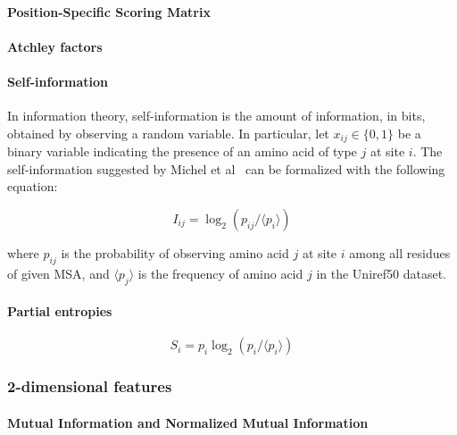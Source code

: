        \paragraph{Position-Specific Scoring Matrix}

        \paragraph{Atchley factors}


        \paragraph{Self-information}

            In information theory, self-information is the amount of information, in bits,
            obtained by observing a random variable. In particular, let $x_{ij} \in \{0, 1\}$ be
            a binary variable indicating the presence of an amino acid of type $j$ at site $i$.
            The self-information suggested by Michel et al~\cite{Michel383133} can be formalized
            with the following equation:

            \begin{equation}
                I_{ij} = \log_2 (p_{ij} / \langle p_i \rangle)
            \end{equation}

            where $p_{ij}$ is the probability of observing amino acid $j$ at site $i$ among all residues
            of given MSA, and $\langle p_j \rangle$ is the frequency of amino acid $j$
            in the Uniref50 dataset.

        \paragraph{Partial entropies}

            \cite{Michel383133}

            \begin{equation}
                S_i = p_i \log_2 (p_i / \langle p_i \rangle)
            \end{equation}

    \subsubsection{2-dimensional features}

        \paragraph{Mutual Information and Normalized Mutual Information}

